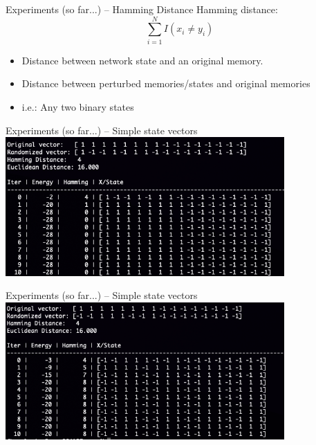 \documentclass[10pt]{beamer}
\begin{document}
\begin{frame}{Experiments (so far...) -- Hamming Distance}
	Hamming distance:
	\begin{equation}
		\sum^{N}_{i=1} I(x_i  \neq y_i)
	\end{equation}
	\begin{itemize}
		\item Distance between network  state and an original memory.
		\item Distance between perturbed memories/states and original memories
		\item i.e.: Any two binary states
	\end{itemize}
\end{frame}

\begin{frame}{Experiments (so far...) -- Simple state vectors}	
	\centering
	\includegraphics[width=0.8\textwidth]{"../img/log_vector_good.png"}	
\end{frame}

\begin{frame}{Experiments (so far...) -- Simple state vectors}	
	\centering
	\includegraphics[width=0.8\textwidth]{"../img/log_vector_spurious.png"}
\end{frame}




\end{document}
